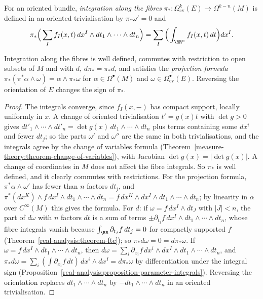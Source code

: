 \begin{definition}\label{characteristic-classes:definition-fibre-integration}
For an oriented bundle, \emph{integration along the fibres} $\pi_* \colon \Omega^k_{\mathrm{cv}}(E) \to \Omega^{k-n}(M)$ is defined in an oriented trivialisation by $\pi_*\omega' = 0$ and
\[
\pi_*\Big(\sum_If_I(x, t)\,dx^I \wedge dt_1 \wedge \cdots \wedge dt_n\Big) = \sum_I\Big(\int_{\RR^n}f_I(x, t)\,dt\Big)dx^I.
\]
\end{definition}

\begin{proposition}\label{characteristic-classes:proposition-fibre-integration}
Integration along the fibres is well defined, commutes with restriction to open subsets of $M$ and with $d$, $d\pi_* = \pi_*d$, and satisfies the \emph{projection formula} $\pi_*(\pi^*\alpha \wedge \omega) = \alpha \wedge \pi_*\omega$ for
$\alpha \in \Omega^\bullet(M)$ and $\omega \in \Omega^\bullet_{\mathrm{cv}}(E)$. Reversing the orientation of $E$ changes the sign of $\pi_*$.
\end{proposition}

\begin{proof}
The integrals converge, since $f_I(x, -)$ has compact support, locally uniformly in $x$. A change of oriented trivialisation $t' = g(x)t$ with $\det g > 0$ gives $dt'_1 \wedge \cdots \wedge dt'_n = \det g(x)\,dt_1 \wedge \cdots \wedge dt_n$
plus terms containing some $dx^i$ and fewer $dt_j$; so the parts $\omega'$ and $\omega''$ are the same in both trivialisations, and the integrals agree by the change of variables formula
(Theorem~\ref{measure-theory:theorem-change-of-variables}), with Jacobian $\det g(x) = |\det g(x)|$. A change of coordinates in $M$ does not affect the fibre integrals. So $\pi_*$ is well defined, and it clearly commutes with
restrictions. For the projection formula, $\pi^*\alpha \wedge \omega'$ has fewer than $n$ factors $dt_j$, and $\pi^*(dx^K) \wedge f\,dx^I \wedge dt_1 \wedge \cdots \wedge dt_n = f\,dx^K \wedge dx^I \wedge dt_1 \wedge \cdots \wedge dt_n$; by linearity
in $\alpha$ over $C^\infty(M)$ this gives the formula. For $d$: if $\omega = f\,dx^I \wedge dt_J$ with $|J| < n$, the part of $d\omega$ with $n$ factors $dt$ is a sum of terms $\pm\partial_{t_j}f\,dx^I \wedge dt_1 \wedge \cdots \wedge dt_n$, whose fibre
integrals vanish because $\int_\RR\partial_{t_j}f\,dt_j = 0$ for compactly supported $f$ (Theorem~\ref{real-analysis:theorem-ftc}); so $\pi_*d\omega = 0 = d\pi_*\omega$. If $\omega = f\,dx^I \wedge dt_1 \wedge \cdots \wedge dt_n$, then
$d\omega = \sum_i\partial_{x_i}f\,dx^i \wedge dx^I \wedge dt_1 \wedge \cdots \wedge dt_n$, and $\pi_*d\omega = \sum_i(\int\partial_{x_i}f\,dt)\,dx^i \wedge dx^I = d\pi_*\omega$ by differentiation under the integral sign
(Proposition~\ref{real-analysis:proposition-parameter-integrals}). Reversing the orientation replaces $dt_1 \wedge \cdots \wedge dt_n$ by $-dt_1 \wedge \cdots \wedge dt_n$ in an oriented trivialisation.
\end{proof}

